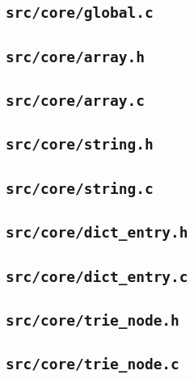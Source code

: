 \documentclass[../main.tex]{subfiles}
\begin{document}
\subsection{\texttt{src/core/global.c}}


\subsection{\texttt{src/core/array.h}}


\subsection{\texttt{src/core/array.c}}


\subsection{\texttt{src/core/string.h}}


\subsection{\texttt{src/core/string.c}}


\subsection{\texttt{src/core/dict\_entry.h}}


\subsection{\texttt{src/core/dict\_entry.c}}


\subsection{\texttt{src/core/trie\_node.h}}


\subsection{\texttt{src/core/trie\_node.c}}

\end{document}
